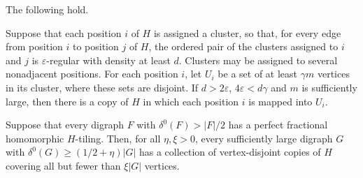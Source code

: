\begin{lemma}
\label{framework390:embed}\label{general:round}
The following hold.
\begin{props}
\item\label{framework390:embed:1} Suppose that each position $i$ of $H$ is assigned a cluster, so that, for every edge from position $i$ to position $j$ of $H$, the ordered pair of the clusters assigned to $i$ and $j$ is $\varepsilon$-regular with density at least $d$. Clusters may be assigned to several nonadjacent positions. For each position $i$, let $U_i$ be a set of at least $\gamma m$ vertices in its cluster, where these sets are disjoint.
If $d>2\varepsilon$, $4\varepsilon<d\gamma$ and $m$ is sufficiently
large, then there is a copy of $H$ in which each position $i$ is mapped into $U_i$.
\item\label{framework390:embed:2} Suppose that every digraph $F$ with $\delta^0(F)>|F|/2$ has
a perfect fractional homomorphic $H$-tiling. Then, for all $\eta,\xi>0$,
every sufficiently large digraph $G$ with $\delta^0(G)\ge(1/2+\eta)|G|$
has a collection of vertex-disjoint copies of $H$ covering all but fewer than $\xi|G|$ vertices.
\end{props}
\end{lemma}
